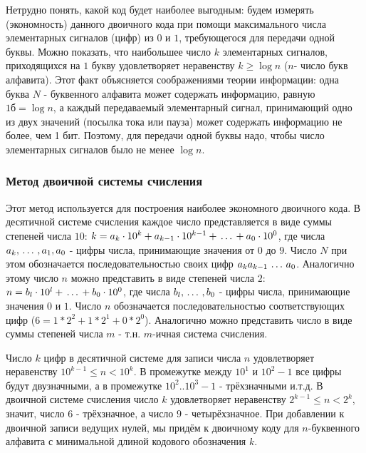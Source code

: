 ﻿\documentclass[a4paper,12pt]{report}
\begin{document}
	
	


	
	Нетрудно понять, какой код будет наиболее выгодным: будем измерять  (экономность) данного двоичного кода при помощи максимального числа элементарных сигналов (цифр) из $0$ и $1$, требующегося для передачи одной буквы. Можно показать, что наибольшее число $k$ элементарных сигналов, приходящихся на $1$ букву удовлетворяет неравенству $k \ge \log n$ ($n$- число букв алфавита). Этот факт объясняется соображениями теории информации: одна буква $N$ - буквенного алфавита может содержать информацию, равную $1\mbox{б} = \log n$, а каждый передаваемый элементарный сигнал, принимающий одно из двух значений (посылка тока или пауза) может содержать информацию не более, чем 1 бит. Поэтому, для передачи одной буквы надо, чтобы число элементарных сигналов было не менее $\log n$.
	



	\subsubsection{Метод двоичной системы счисления}

	

		Этот метод используется для построения наиболее экономного двоичного кода. В десятичной системе счисления каждое число представляется в виде суммы степеней числа $10$: $k = a_k \cdot 10^k +a_{k-1} \cdot 10^{k-1} + \,\ldots\, + a_0 \cdot 10^0$, где числа $a_k, \,\ldots\, ,a_1,a_0$ - цифры числа, принимающие значения от $0$ до $9$. Число $N$ при этом обозначается последовательностью своих цифр $a_k a_{k-1} \,\ldots\, a_0$. Аналогично этому число $n$ можно представить в виде степеней числа $2$: $n = b_l \cdot 10^l + \,\ldots\, + b_0 \cdot 10^0$, где числа $b_l, \,\ldots\, ,b_0$ - цифры числа, принимающие значения $0$ и $1$. Число $n$ обозначается последовательностью соответствующих цифр ($6 = 1*2^2 + 1*2^1 + 0 * 2^0$). Аналогично можно представить число в виде суммы степеней числа $m$ - т.н. $m$-ичная система счисления. 
		
		Число $k$ цифр в десятичной системе для записи числа $n$ удовлетворяет неравенству $10^{k-1} \le n < 10^k$. В промежутке между $10^1$ и $10^2 - 1$ все цифры будут двузначными, а в промежутке $10^2 .. 10^3 - 1$ - трёхзначными и.т.д.
		В двоичной системе счисления число $k$ удовлетворяет неравенству $2^{k-1} \le n < 2^k$, значит, число $6$ - трёхзначное, а число $9$ - четырёхзначное. При добавлении к двоичной записи ведущих нулей, мы придём к  двоичному коду для $n$-буквенного алфавита с минимальной длиной кодового обозначения $k$.
		
\end{document}
